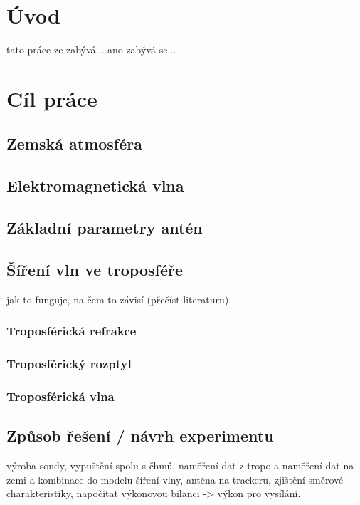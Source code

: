 \documentclass[twoside]{ctuthesis}
\theoremstyle{plain}
\theoremstyle{definition}
\theoremstyle{note}
\begin{document}
\maketitle

\chapter{Úvod}
tato práce ze zabývá... ano zabývá se...



\chapter{Cíl práce}
	\section{Zemská atmosféra}
	\section{Elektromagnetická vlna}
	\section{Základní parametry antén}
	\section{Šíření vln ve troposféře}
	jak to funguje, na čem to závisí (přečíst literaturu)
		\subsection{Troposférická refrakce}
		\subsection{Troposférický rozptyl}
		\subsection{Troposférická vlna}

	\section{Způsob řešení / návrh experimentu}
	výroba sondy, vypuštění spolu s čhmú, naměření dat z tropo a naměření dat na zemi a kombinace do modelu šíření vlny, anténa na trackeru, zjištění směrové charakteristiky, napočítat výkonovou bilanci -> výkon pro vysílání.
\end{document}
